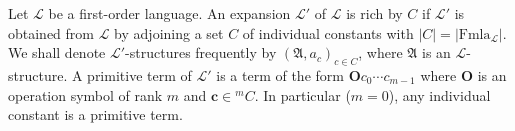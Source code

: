 Let $\mathcal{L}$ be a first-order language. An expansion $\mathcal{L}'$ of $\mathcal{L}$ is rich by $C$ if $\mathcal{L}'$ is obtained from $\mathcal{L}$ by adjoining a set $C$ of individual constants with $|C| = |\text{Fmla}_{\mathcal{L}}|$. We shall denote $\mathcal{L}'$-structures frequently by $(\mathfrak{A}, a_c)_{c \in C}$, where $\mathfrak{A}$ is an $\mathcal{L}$-structure. A primitive term of $\mathcal{L}'$ is a term of the form $\mathbf{O}c_0 \cdots c_{m-1}$ where $\mathbf{O}$ is an operation symbol of rank $m$ and $\mathbf{c} \in {}^m C$. In particular ($m = 0$), any individual constant is a primitive term.
